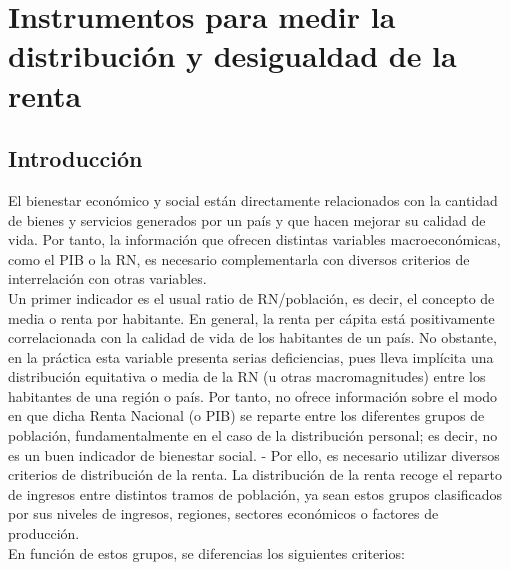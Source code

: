 \chapter{Instrumentos para medir la distribución y desigualdad de la renta}

\section{Introducción}
El bienestar económico y social están directamente relacionados con la cantidad de bienes y servicios generados por un país y que hacen mejorar su calidad de vida. Por tanto, la información que ofrecen distintas variables macroeconómicas, como el PIB o la RN, es necesario complementarla con diversos criterios de interrelación con otras variables.\\
Un primer indicador es el usual ratio de RN/población, es decir, el concepto de media o renta por habitante. En general, la renta per cápita está positivamente correlacionada con la calidad de vida de los habitantes de un país. No obstante, en la práctica esta variable presenta serias deficiencias, pues lleva implícita una distribución equitativa o media de la RN (u otras macromagnitudes) entre los habitantes de una región o país. Por tanto, no ofrece información sobre el modo en que dicha Renta Nacional (o PIB) se reparte entre los diferentes grupos de población, fundamentalmente en el caso de la distribución personal; es decir, no es un buen indicador de bienestar social. - Por ello, es necesario utilizar diversos criterios de distribución de la renta. La distribución de la renta recoge el reparto de ingresos entre distintos tramos de población, ya sean estos grupos clasificados por sus niveles de ingresos, regiones, sectores económicos o factores de producción.\\
En función de estos grupos, se diferencias los siguientes criterios:

